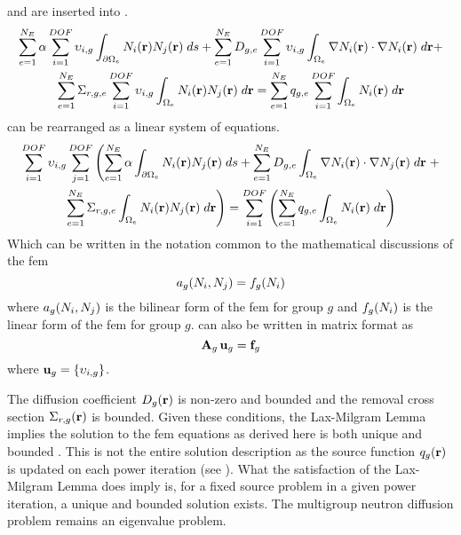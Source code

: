      and  are inserted 
    into .
    \begin{multline}
      \label{eq:this_above}
      \sum_{e=1}^{N_E} \alpha \sum_{i=1}^{DOF} \upsilon_{i,g}
        \int_{\partial \Omega_e}
        N_i(\mathbf{r})  N_j(\mathbf{r}) \;ds +
        \sum_{e=1}^{N_E} D_{g,e} \sum_{i=1}^{DOF} \upsilon_{i,g}
        \int_{\Omega_e} \mathbf{\nabla} N_i(\mathbf{r}) \cdot \mathbf{\nabla} N_i(\mathbf{r})\;d\mathbf{r}
        + \\
        \sum_{e=1}^{N_E} \Sigma_{r,g,e} \sum_{i=1}^{DOF} \upsilon_{i,g}
        \int_{\Omega_e} N_i(\mathbf{r}) N_j(\mathbf{r}) \; d\mathbf{r} =
        \sum_{e=1}^{N_E} q_{g,e} \sum_{i=1}^{DOF} 
        \int_{\Omega_e} N_i(\mathbf{r}) \; d\mathbf{r}
    \end{multline}
     can be rearranged as a linear system of equations.
    \begin{multline}
      \label{eq:linear_equation}
      \sum_{i=1}^{DOF} \upsilon_{i,g} \sum_{j=1}^{DOF} \left(
        \sum_{e=1}^{N_E} \alpha \int_{\partial \Omega_e}
        N_i(\mathbf{r})  N_j(\mathbf{r}) \;ds +
        \sum_{e=1}^{N_E} D_{g,e} 
        \int_{\Omega_e} \mathbf{\nabla} N_i(\mathbf{r}) \cdot \mathbf{\nabla} N_j(\mathbf{r})\;d\mathbf{r}
        \right.
        + \\
        \left.
        \sum_{e=1}^{N_E} \Sigma_{r,g,e}
        \int_{\Omega_e} N_i(\mathbf{r}) N_j(\mathbf{r}) \; d\mathbf{r} \right) =
        \sum_{i=1}^{DOF} \left(
        \sum_{e=1}^{N_E} q_{g,e} 
        \int_{\Omega_e} N_i(\mathbf{r}) \; d\mathbf{r} \right)
    \end{multline}
    Which can be written in the notation common to the mathematical discussions 
    of the \gls{fem}
    \begin{equation}
      \label{eq:fem_notation}
      a_g(N_i,N_j) = f_g(N_i)
    \end{equation}
    where $a_g(N_i,N_j)$ is the bilinear form of the \gls{fem} for 
    group $g$ and $f_g(N_i)$ is the linear form of the \gls{fem} for group
    $g$.
     can also be written in matrix format as
    \begin{equation}
      \label{eq:matrix_notation}
      \mathbf{A}_g \, \mathbf{u}_g = \mathbf{f}_g
    \end{equation}
    where $\mathbf{u}_g = \{\upsilon_{i,g}\}$. 
    
    The diffusion coefficient $D_g(\mathbf{r})$ is non-zero and bounded and the removal
    cross section $\Sigma_{r,g}(\mathbf{r})$ is bounded. Given these conditions, the
    Lax-Milgram Lemma implies the solution to the \gls{fem} equations as derived
    here is both unique and bounded \cite{textbookli}. This is not the entire
    solution description as the source function $q_g(\mathbf{r})$ is updated on each
    power iteration (see ). What the satisfaction of
    the Lax-Milgram Lemma does imply is, for a fixed source problem 
    in a given power iteration, a unique and bounded solution exists. The
    multigroup neutron diffusion problem remains an eigenvalue problem.
    
